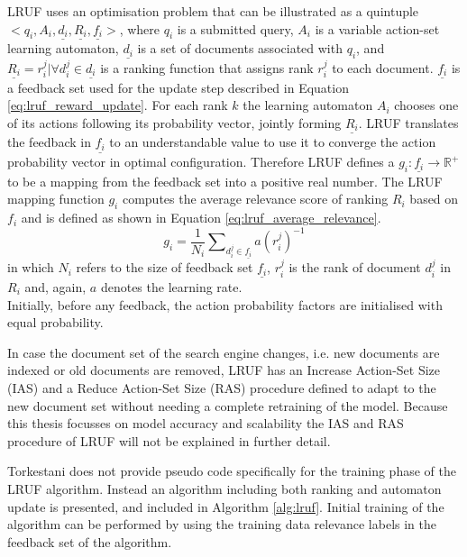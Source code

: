 LRUF uses an optimisation problem that can be illustrated as a quintuple $<q_i,A_i,\underline{d_i},\underline{R_i},\underline{f_i}>$, where $q_i$ is a submitted query, $A_i$ is a variable action-set learning automaton, $\underline{d_i}$ is a set of documents associated with $q_i$, and $\underline{R_i}={r_i^j|\forall d_i^j \in \underline{d_i}}$ is a ranking function that assigns rank $r_i^j$ to each document. $\underline{f_i}$ is a feedback set used for the update step described in Equation \ref{eq:lruf_reward_update}. For each rank $k$ the learning automaton $A_i$ chooses one of its actions following its probability vector, jointly forming $\underline{R_i}$. LRUF translates the feedback in $\underline{f_i}$ to an understandable value to use it to converge the action probability vector in optimal configuration. Therefore LRUF defines a $g_i: \underline{f_i} \rightarrow \mathbb{R}^{+}$ to be a mapping from the feedback set into a positive real number. The LRUF mapping function $g_i$ computes the average relevance score of ranking $R_i$ based on $f_i$ and is defined as shown in Equation \ref{eq:lruf_average_relevance}.
\begin{equation}
g_i=\frac{1}{N_i}\sum\nolimits_{d_{i}^{j}\in \underline{f_i}} a(r_{i}^{j})^{-1}
\label{eq:lruf_average_relevance}
\end{equation}
\noindent in which $N_i$ refers to the size of feedback set $\underline{f_i}$, $r_i^j$ is the rank of document $d_i^j$ in $R_i$ and, again, $a$ denotes the learning rate.\\

Initially, before any feedback, the action probability factors are initialised with equal probability.

In case the document set of the search engine changes, i.e. new documents are indexed or old documents are removed, LRUF has an Increase Action-Set Size (IAS) and a Reduce Action-Set Size (RAS) procedure defined to adapt to the new document set without needing a complete retraining of the model. Because this thesis focusses on model accuracy and scalability the IAS and RAS procedure of LRUF will not be explained in further detail.

Torkestani \cite{Torkestani2012b} does not provide pseudo code specifically for the training phase of the LRUF algorithm. Instead an algorithm including both ranking and automaton update is presented, and included in Algorithm \ref{alg:lruf}. Initial training of the algorithm can be performed by using the training data relevance labels in the feedback set of the algorithm.

